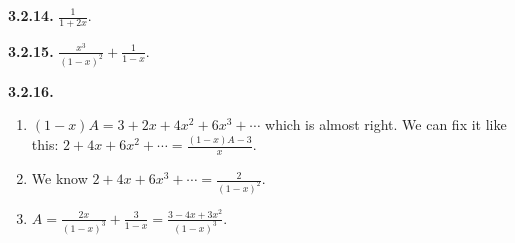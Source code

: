\documentclass[10pt,]{book}
\theoremstyle{plain}
\theoremstyle{definition}
\theoremstyle{definition}
\theoremstyle{definition}
\theoremstyle{definition}
\numberwithin{equation}{chapter}
\begin{document}
%
\par\smallskip
\noindent\textbf{3.2.14.} \hypertarget{p-1155}{}%
\(\frac{1}{1+2x}\).%
\par\smallskip
\noindent\textbf{3.2.15.} \hypertarget{p-1157}{}%
\(\frac{x^3}{(1-x)^2} + \frac{1}{1-x}\).%
\par\smallskip
\noindent\textbf{3.2.16.} \hypertarget{p-1163}{}%
\leavevmode%
\begin{enumerate}[label=(\alph*)]
\item\hypertarget{li-209}{}\((1-x)A = 3 + 2x + 4x^2 + 6x^3 + \cdots\) which is almost right.  We can fix it like this: \(2 + 4x + 6x^2 + \cdots = \frac{(1-x)A - 3}{x}\).%
\item\hypertarget{li-210}{}\hypertarget{p-1164}{}%
We know \(2 + 4x + 6x^3 + \cdots = \frac{2}{(1-x)^2}\).%
\item\hypertarget{li-211}{}\(A = \frac{2x}{(1-x)^3} + \frac{3}{1-x} = \frac{3 -4x + 3x^2}{(1-x)^3}\).%
\end{enumerate}
%
\par\smallskip
\end{document}
